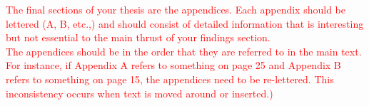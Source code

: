 \textcolor{red}{The final sections of your thesis are the appendices. Each appendix should be lettered (A, B, etc.,) and should consist of detailed information that is interesting but not essential to the main thrust of your findings section.\\
The appendices should be in the order that they are referred to in the main text. For instance, if Appendix A refers to something on page 25 and Appendix B refers to something on page 15, the appendices need to be re-lettered. This inconsistency occurs when text is moved around or inserted.)}

